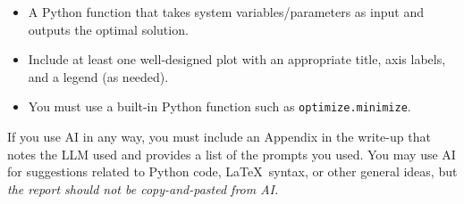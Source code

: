 \documentclass[article, 11pt]{article}
\begin{document}
\noindent {}

\vspace{-.35cm}
\noindent \hrulefill

\begin{itemize}
	\item A Python function that takes system variables/parameters as input and outputs the optimal solution.
	\item Include at least one well-designed plot with an appropriate title, axis labels, and a legend (as needed).
	\item You must use a built-in Python function such as \texttt{optimize.minimize}.
\end{itemize}

\noindent {}

\vspace{-.35cm}
\noindent \hrulefill

If you use AI in any way, you must include an Appendix in the write-up that notes the LLM used and provides a list of the prompts you used. You may use AI for suggestions related to Python code, \LaTeX\, syntax, or other general ideas, but \textit{the report should not be copy-and-pasted from AI.}
\end{document}

